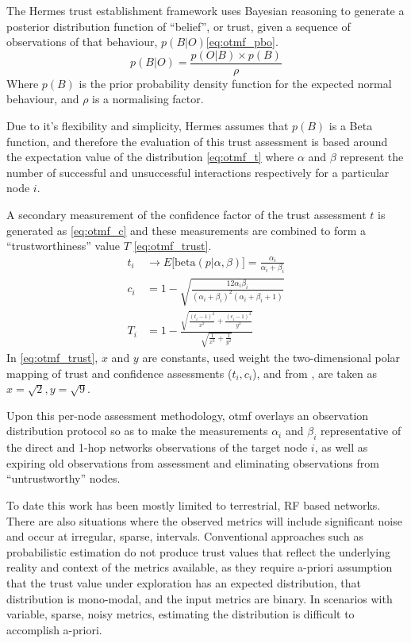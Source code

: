 The Hermes trust establishment framework \cite{Zouridaki2005} uses Bayesian reasoning to generate a posterior distribution function of ``belief'', or trust, given a sequence of observations of that behaviour, $p(B|O)$\eqref{eq:otmf_pbo}.
%
\begin{equation}
  p(B|O)  = \frac{p(O|B) \times p(B)}{\rho}
  \label{eq:otmf_pbo}
\end{equation}
%
Where $p(B)$ is the prior probability density function for the expected normal behaviour, and $\rho$ is a normalising factor.

Due to it's flexibility and simplicity, Hermes assumes that $p(B)$ is a Beta function, and therefore the evaluation of this trust assessment is based around the expectation value of the distribution \eqref{eq:otmf_t}  where $\alpha$ and $\beta$ represent the number of successful and unsuccessful interactions respectively for a particular node $i$.

A secondary measurement of the confidence factor of the trust assessment $t$ is generated as \eqref{eq:otmf_c} and these measurements are combined to form a ``trustworthiness'' value $T$ \eqref{eq:otmf_trust}.
%
\begin{align}
  t_i &\to E\lbrack\text{beta}(p|\alpha,\beta)\rbrack = \frac{\alpha_i}{\alpha_i+\beta_i} \label{eq:otmf_t}\\[5pt]
  c_i &= 1 - \sqrt{\frac{12\alpha_i\beta_i}{(\alpha_i+\beta_i)^2(\alpha_i+\beta_i+1)}} \label{eq:otmf_c}\\[5pt]
  T_i &= 1 - \frac{\sqrt{\frac{(t_i-1)^2}{x^2} + \frac{(c_i-1)^2}{y^2}}}{\sqrt{\frac{1}{x^2}+\frac{1}{y^2}}} \label{eq:otmf_trust}
\end{align}
%
In \eqref{eq:otmf_trust}, $x$ and $y$ are constants, used weight the two-dimensional polar mapping of trust and confidence assessments ($t_i,c_i$), and from \cite{Zouridaki2005}, are taken as $x=\sqrt{2},y=\sqrt{9}$.

Upon this per-node assessment methodology, \gls{otmf} overlays an observation distribution protocol so as to make the measurements $\alpha_i$ and $\beta_i$ representative of the direct and 1-hop networks observations of the target node $i$, as well as expiring old observations from assessment and eliminating observations from ``untrustworthy'' nodes.


To date this work has been mostly limited to terrestrial, RF based networks.
There are also situations where the observed metrics will include significant noise and occur at irregular, sparse, intervals.
Conventional approaches such as probabilistic estimation do not produce trust values that reflect the underlying reality and context of the metrics available, as they require a-priori assumption that the trust value under exploration has an expected distribution, that distribution is mono-modal, and the input metrics are binary.
In scenarios with variable, sparse, noisy metrics, estimating the distribution is difficult to accomplish a-priori.

